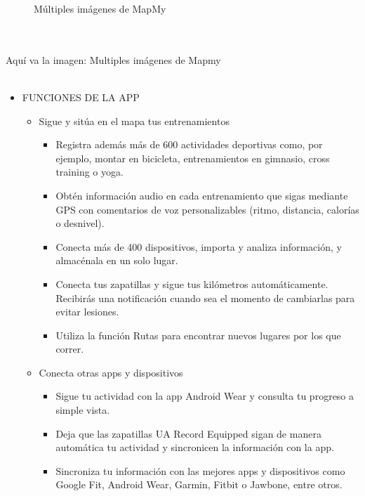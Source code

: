 \documentclass[a4paper, 11pt]{article}
\begin{document}
\begin{itemize}
\begin{figure}[h]
                            \caption{Múltiples imágenes de MapMy}
                            \label{f:mapmy}
                        \end{figure}
                        \\\\\textcolor[rgb]{1,0,0}{Aquí va la imagen: Multiples imágenes de Mapmy}\\\\
                          \begin{itemize}
                            \item{FUNCIONES DE LA APP}
                            \begin{itemize}
                              \item {Sigue y sitúa en el mapa tus entrenamientos}
                              \begin{itemize}
                                \item {Registra además más de 600 actividades deportivas como, por ejemplo, montar en bicicleta, entrenamientos en gimnasio, cross training o yoga.}
                                \item {Obtén información audio en cada entrenamiento que sigas mediante GPS con comentarios de voz personalizables (ritmo, distancia, calorías o desnivel).}
                                \item {Conecta más de 400 dispositivos, importa y analiza información, y almacénala en un solo lugar.}
                                \item {Conecta tus zapatillas y sigue tus kilómetros automáticamente. Recibirás una notificación cuando sea el momento de cambiarlas para evitar lesiones.}
                                \item {Utiliza la función Rutas para encontrar nuevos lugares por los que correr.}
                              \end{itemize}
                              \item {Conecta otras apps y dispositivos}
                              \begin{itemize}
                                \item {Sigue tu actividad con la app Android Wear y consulta tu progreso a simple vista.}
                                \item {Deja que las zapatillas UA Record Equipped sigan de manera automática tu actividad y sincronicen la información con la app.}
                                \item {Sincroniza tu información con las mejores apps y dispositivos como Google Fit, Android Wear, Garmin, Fitbit o Jawbone, entre otros.}

\end{itemize}
\end{itemize}
\end{itemize}
\end{itemize}
\end{document}
